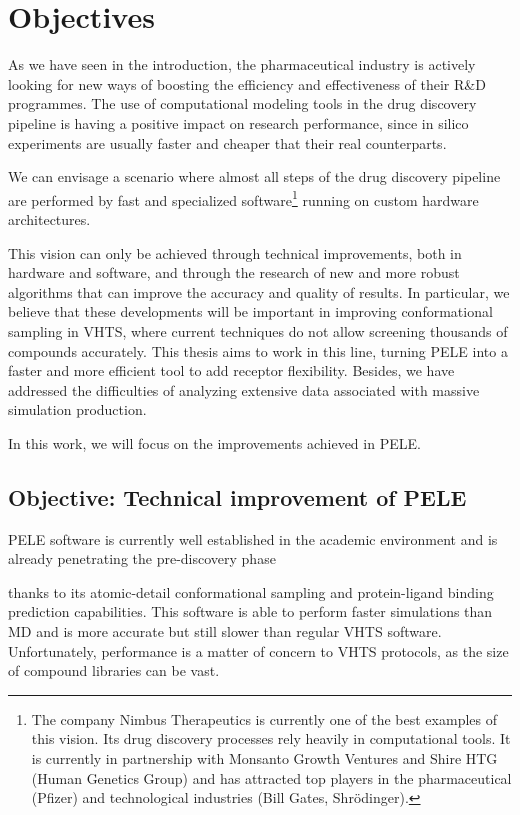 \chapter{Objectives} 

As we have seen in the introduction, the pharmaceutical industry is actively looking for new ways of boosting the efficiency
and effectiveness of their R\&D programmes. The use of computational modeling tools in the drug discovery pipeline is
having a positive impact on research performance, since  in silico experiments are usually faster and cheaper that their
real counterparts. 

We can envisage a scenario where almost all steps of the drug discovery pipeline are performed by fast and specialized
software\footnote{The company Nimbus Therapeutics is currently one of the best examples of this vision. Its drug
discovery processes rely heavily in computational tools. It is currently in partnership with Monsanto Growth Ventures
and Shire HTG (Human Genetics Group) and has attracted top players in the pharmaceutical (Pfizer) and technological
industries (Bill Gates, Shr\"odinger).} running on custom hardware architectures. 

This vision can only be achieved through technical improvements, both in hardware and software, and through the research of new and more
robust algorithms that can improve the accuracy and quality of results. In particular, we believe that these developments will be important in improving conformational sampling in VHTS, where current techniques do not allow screening thousands of compounds accurately. 
This thesis aims to work in this line, turning PELE into a faster and more efficient tool to add receptor flexibility. Besides, we have addressed the difficulties of analyzing extensive data associated with massive simulation production.

In this work, we will focus on the improvements achieved in PELE. 

\section{Objective: Technical improvement of PELE}

PELE software is currently well established in the academic environment and is already penetrating the pre-discovery phase
 thanks to its atomic-detail 
conformational sampling and protein-ligand binding prediction
capabilities. This software is able to perform faster simulations than MD and is more accurate but still slower than regular
VHTS software. Unfortunately, performance is a matter of concern to VHTS protocols, as the size of compound libraries
can be vast. 

